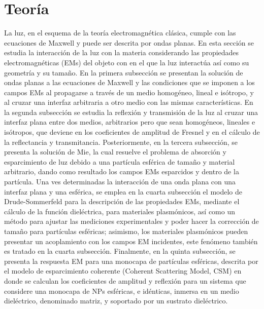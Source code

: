 \chapter{Teoría}


La luz, en el esquema de la teoría electromagnética clásica, cumple con las ecuaciones de Maxwell y puede ser descrita por ondas planas. En esta sección se estudia la interacción de la luz con la materia considerando las propiedades electromagnéticas (EMs) del objeto con en el que la luz interactúa así como su geometría y su tamaño. En la primera subsección se presentan la  solución de ondas planas a las ecuaciones de Maxwell y las condiciones que se imponen a los campos EMs al propagarse a través de un medio homogéneo, lineal e isótropo, y al cruzar una interfaz arbitraria a otro medio con las mismas características. En la segunda subsección  se estudia la reflexión y transmisión de la luz al cruzar una interfaz plana entre dos medios, arbitrarios pero que sean homogéneos, lineales e isótropos, que deviene en los coeficientes de amplitud de Fresnel y en el cálculo de la reflectancia y transmitancia. Posteriormente, en la tercera subsección, se presenta la solución de Mie, la cual resuelve el problema de absorción y esparcimiento de luz debido a una partícula esférica de tamaño y material arbitrario, dando como resultado los campos EMs esparcidos y dentro de la partícula. Una ves determinadas la interacción de una onda plana con una interfaz plana y una esférica, se emplea en la cuarta subsección el modelo de Drude-Sommerfeld para la descripción de las propiedades EMs, mediante el cálculo de la función dieléctrica, para materiales plasmónicos, así como un método para ajustar las mediciones experimentales y poder hacer la corrección de tamaño para partículas esféricas; asimismo, los materiales plasmónicos pueden presentar un acoplamiento con los campos EM incidentes, este fenómeno también es tratado en la cuarta subsección. Finalmente, en la quinta subsección, se presenta la respuesta EM para una monocapa de partículas esféricas, descrita por el modelo de esparcimiento coherente (Coherent Scattering Model, CSM) en donde se calculan los coeficientes de amplitud y reflexión para un sistema que considere una monocapa de NPs esféricas, e idénticas, inmersa en un medio dieléctrico, denominado matriz, y soportado por un sustrato dieléctrico.
%


